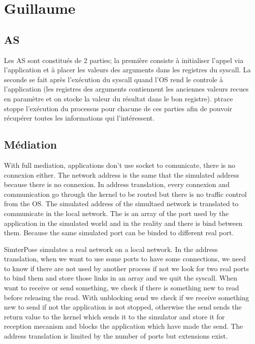 \documentclass{article}
\begin{document}
\section{Guillaume}
\subsection{AS}
Les AS sont constitués de 2 parties; la première consiste à initialiser l'appel
via l'application et à placer les valeurs des arguments dans les registres du
syscall. La seconde se fait après l'exécution du syscall quand l'OS rend le
controle à l'application (les registres des arguments contiennent les anciennes
valeurs recues en paramètre et on stocke la valeur du résultat dans le bon
registre). ptrace stoppe l'exécution du processus pour chacune de ces parties
afin de pouvoir récupérer toutes les informations qui l'intéressent.

\subsection{Médiation}
With full mediation, applications don't use socket to comunicate, there is no connexion either. The network address is the same that the simulated address because there is no connexion.
In address translation, every connexion and communication go through the kernel to be routed but there is no traffic control from the OS. The simulated address of the simultaed network is translated to communicate in the local network. The is an array of the port used by the application in the simulated world and in the reality and there is bind between them. Because the same simulated port can be binded to different real port. 

SimterPose simulates a real network on a local network. In the address translation, when we want to use some ports to have some connections, we need to know if there are not used by another process if not we look for two real ports to bind them and store those links in an array and we quit the syscall. When want to receive or send something, we check if there is something new to read before releasing the read. With unblocking send we check if we receive something new to send if not the application is not stopped, otherwise the send sends the return value to the kernel which sends it to the simulator and store it for reception mecanism and blocks the application which have made the send. The address translation is limited by the number of ports but extensions exist.
\end{document}
